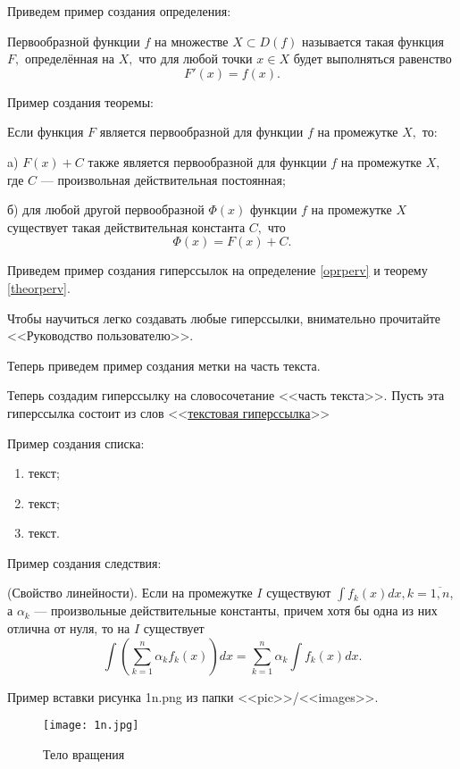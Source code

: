 Приведем пример создания определения:

\begin{opr}\label{oprperv} \rm Первообразной функции $f$ на множестве $X{\subset}D(f)$
называется такая функция $F,$ определённая на $X,$ что для любой
точки $x\in{X}$ будет выполняться равенство
  $$F'(x)=f(x).$$
\end{opr}

Пример создания теоремы:
\begin{theorem}\label{theorperv} Если функция $F$ является первообразной для функции $f$
на промежутке $X,$ то:

   {\rm a)} $F(x)+C$ также является первообразной для функции $f$ на промежутке
$X,$ где $C$ --- произвольная действительная постоянная;

    {\rm б)} для любой
другой первообразной $\Phi(x)$ функции $f$ на промежутке $X$
существует такая действительная константа $C,$ что
  $$\Phi(x)=F(x)+C.$$
\end{theorem}

Приведем пример создания гиперссылок на определение \ref{oprperv}  и теорему \ref{theorperv}.

Чтобы научиться легко создавать любые гиперссылки, внимательно прочитайте <<Руководство
пользователю>>.

Теперь приведем пример создания метки {\color{green}\hypertarget{metkatext}{на часть текста}}.

Теперь создадим гиперссылку на словосочетание <<часть текста>>. Пусть эта гиперссылка
состоит из слов <<\hyperlink{metkatext}{текстовая гиперссылка}>>

Пример создания списка:
\begin{enumerate}
\item текст;
\item текст;
\item текст.
\end{enumerate}

Пример создания следствия:
\begin{corollary}{\rm(Свойство линейности)}. Если на промежутке $I$ существуют $\int
f_k(x)dx, k=\overline{1,n}$, а $\alpha_k$ --- произвольные
действительные константы, причем хотя бы одна из них отлична от
нуля, то на $I$ существует $$\int\left(\sum_{k=1}^n \alpha_k
f_k(x)\right)dx=\sum_{k=1}^n \alpha_k
\int{f_k(x)dx}.$$\end{corollary}

Пример вставки рисунка 1n.png из папки <<pic>>/<<images>>.
\begin{figure}[h!]\center
  \texttt{[image: 1n.jpg]}
   \caption{Тело вращения}\label{ris1}
\end{figure}

